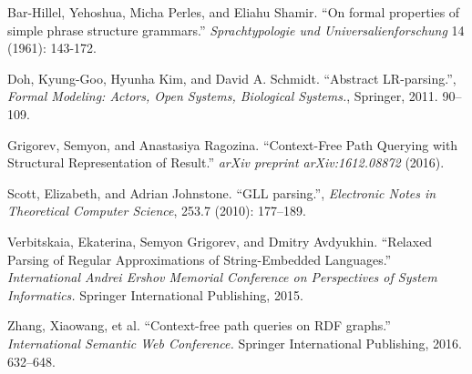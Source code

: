 \documentclass{vldb}
\begin{document}
\begin{thebibliography}{9}

  Bar-Hillel, Yehoshua, Micha Perles, and Eliahu Shamir.
  ``On formal properties of simple phrase structure grammars.''
   \emph{Sprachtypologie und Universalienforschung}
   14 (1961): 143-172.

  Doh, Kyung-Goo, Hyunha Kim, and David A. Schmidt.
  ``Abstract LR-parsing.'',
  \emph{Formal Modeling: Actors, Open Systems, Biological Systems.},
  Springer,
  2011.
  90--109.

  Grigorev, Semyon, and Anastasiya Ragozina. 
  ``Context-Free Path Querying with Structural Representation of Result.''
   \emph{arXiv preprint arXiv:1612.08872}
    (2016).

  Scott, Elizabeth, and Adrian Johnstone.   
  ``GLL parsing.'',
  \emph{Electronic Notes in Theoretical Computer Science},
  253.7 (2010): 177--189.

  Verbitskaia, Ekaterina, Semyon Grigorev, and Dmitry Avdyukhin.
  ``Relaxed Parsing of Regular Approximations of String-Embedded Languages.''
  \emph{International Andrei Ershov Memorial Conference on Perspectives of System Informatics.}
  Springer International Publishing, 2015.

  Zhang, Xiaowang, et al.
  ``Context-free path queries on RDF graphs.'' 
  \emph{International Semantic Web Conference.}
   Springer International Publishing, 2016.
   632--648.

\end{thebibliography}
\end{document}
